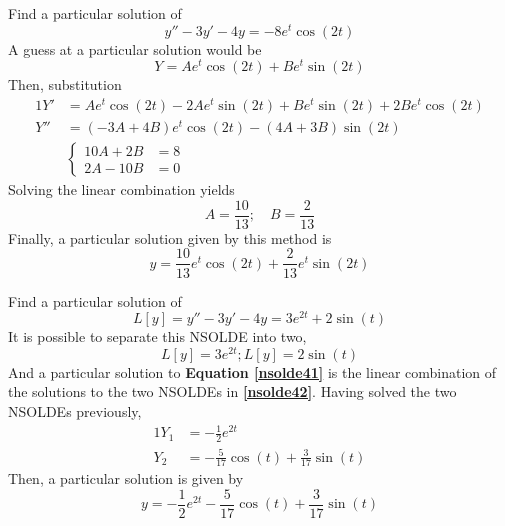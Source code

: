 \documentclass[diffeq.tex]{subfiles}
\begin{document}
    \begin{example}
        Find a particular solution of
        \begin{equation}
            y'' - 3y' -4y = -8e^{t}\cos(2t)
        \end{equation}
        A guess at a particular solution would be
        \begin{equation}
            Y = Ae^{t}\cos(2t) + Be^{t}\sin(2t)
        \end{equation}
        Then, substitution
        \begin{alignat}{1}
            Y' &= Ae^{t}\cos(2t)-2Ae^{t}\sin(2t) + Be^{t}\sin(2t) + 2Be^{t}\cos(2t)\\
            Y'' &= (-3A + 4B)e^{t}\cos(2t) - (4A + 3B)\sin(2t)\\
            & \begin{cases}
                10A + 2B &= 8\\
                2A-10B &= 0
            \end{cases}
        \end{alignat}
        Solving the linear combination yields
        \begin{equation}
            A = \frac{10}{13};\quad B = \frac{2}{13}
        \end{equation}
        Finally, a particular solution given by this method is
        \begin{equation}
            y = \frac{10}{13}e^{t}\cos(2t) + \frac{2}{13}e^{t}\sin(2t)
        \end{equation}
    \end{example}
    \np
    \begin{example}
        Find a particular solution of
        \begin{equation}
            \label{nsolde41}
            L[y] = y'' -3y' -4y = 3e^{2t} + 2\sin(t)
        \end{equation}
        It is possible to separate this NSOLDE into two,
        \begin{equation}
            \label{nsolde42}
            L[y] = 3e^{2t}; L[y] = 2\sin(t)
        \end{equation}
        And a particular solution to \textbf{Equation \ref{nsolde41}} is the linear combination of the solutions to the two NSOLDEs in \textbf{\ref{nsolde42}}.
        Having solved the two NSOLDEs previously,
        \begin{alignat}{1}
            Y_{1} &= -\frac{1}{2}e^{2t}\\
            Y_{2} &= -\frac{5}{17}\cos(t) + \frac{3}{17}\sin(t)
        \end{alignat}
        Then, a particular solution is given by
        \begin{equation}
            y = -\frac{1}{2}e^{2t} -\frac{5}{17}\cos(t) + \frac{3}{17}\sin(t)
        \end{equation}
    \end{example}
\end{document}
